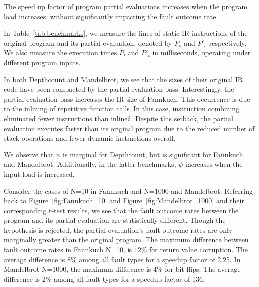 \begin{obs}
  \label{obs:speedup}
  The speed up factor of program partial evaluations increases when the program load increases, without significantly impacting the fault outcome rate.
\end{obs}

In Table~\ref{tab:benchmarks}, we measure the lines of static IR instructions of the original program and its partial evaluation, denoted by $P_s$ and $P'_s$ respectively.
We also measure the execution times $P_t$ and $P'_t$ in milliseconds, operating under different program inputs. 

In both Depthcount and Mandelbrot, we see that the sizes of their original IR code have been compacted by the partial evaluation pass.
Interestingly, the partial evaluation pass increases the IR size of Fannkuch.
This occurrence is due to the inlining of repetitive function calls.
In this case, instruction combining eliminated fewer instructions than inlined.
Despite this setback, the partial evaluation executes faster than its original program due to the reduced number of stack operations and fewer dynamic instructions overall. 
   
We observe that $\psi$ is marginal for Depthcount, but is significant for Fannkuch and Mandelbrot.
Additionally, in the latter benchmarks, $\psi$ increases when the input load is increased.

Consider the cases of N=10 in Fannkuch and N=1000 and Mandelbrot.
Referring back to Figure~\ref{fig:Fannkuch_10} and Figure~\ref{fig:Mandelbrot_1000} and their corresponding t-test results, we see that the fault outcome rates between the program and its partial evaluation are statistically different.
Though the hypothesis is rejected, the partial evaluation's fault outcome rates are only marginally greater than the original program.
The maximum difference between fault outcome rates in Fannkuch N=10, is $12\%$ for return value corruption.
The average difference is 8\% among all fault types for a speedup factor of 2.25. 
In Mandelbrot N=1000, the maximum difference is $4\%$ for bit flips.
The average difference is 2\% among all fault types for a speedup factor of 136. 


